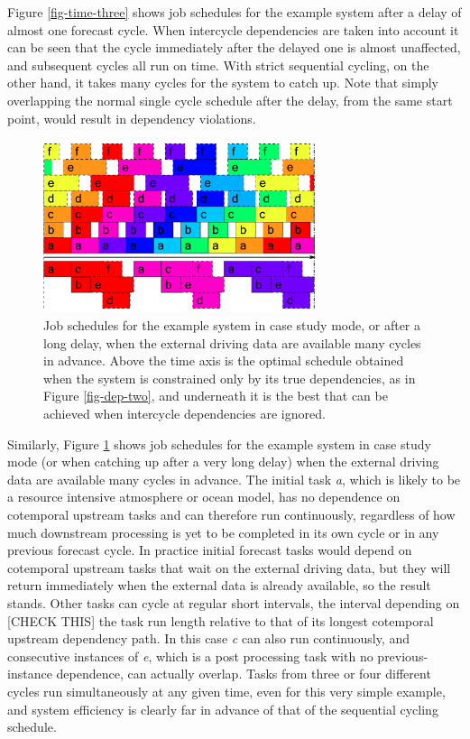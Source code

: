 \documentclass[11pt,a4paper]{article}
\begin{document}
Figure \ref{fig-time-three} shows job schedules for the example system
after a delay of almost one forecast cycle. When intercycle dependencies
are taken into account it can be seen that the cycle immediately after
the delayed one is almost unaffected, and subsequent cycles all run on
time. With strict sequential cycling, on the other hand, it
takes many cycles for the system to catch up. Note that simply
overlapping the normal single cycle schedule after the delay, from the
same start point, would result in dependency violations.

\begin{figure} 
    \begin{center} 
        \includegraphics[width=8cm]{timeline-two}
    \end{center} 
    \caption{\small Job schedules for the example system in case study
    mode, or after a long delay, when the external driving data are
    available many cycles in advance. Above the time axis is the optimal
    schedule obtained when the system is constrained only by its true
    dependencies, as in Figure \ref{fig-dep-two}, and underneath it is
    the best that can be achieved when intercycle dependencies are
    ignored.} 
    \label{fig-time-two}
\end{figure} 

Similarly, Figure \ref{fig-time-two} shows job schedules for the example
system in case study mode (or when catching up after a very long delay)
when the external driving data are available many cycles in advance. The
initial task {\em a}, which is likely to be a resource intensive
atmosphere or ocean model, has no dependence on cotemporal upstream
tasks and can therefore run continuously, regardless of how much
downstream processing is yet to be completed in its own cycle or in any
previous forecast cycle. In practice initial forecast tasks would depend
on cotemporal upstream tasks that wait on the external driving data, but
they will return immediately when the external data is already
available, so the result stands. Other tasks can cycle at regular short
intervals, the interval depending on [CHECK THIS] the task run length
relative to that of its longest cotemporal upstream dependency path. In
this case {\em c} can also run continuously, and consecutive instances
of {\em e}, which is a post processing task with no previous-instance
dependence, can actually overlap. Tasks from three or four different
cycles run simultaneously at any given time, even for this very simple
example, and system efficiency is clearly far in advance of that of the
sequential cycling schedule.  
\end{document}
